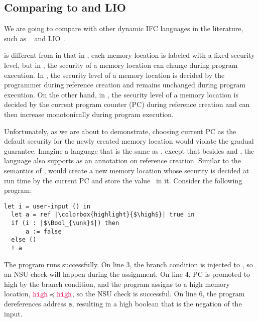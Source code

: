 \subsection{Comparing \DynIFC to \laminfo and LIO}
\label{sec:compare-dynifc}

We are going to compare \DynIFC with other dynamic IFC languages in the
literature, such as \laminfo~\parencite{austin2009efficient} and
LIO~\parencite{STEFAN:2017ta}.

\DynIFC is different from \laminfo in that in \DynIFC, each memory location is
labeled with a fixed security level, but in \laminfo, the security of a memory
location can change during program execution. In \DynIFC, the security level of
a memory location is decided by the programmer during reference creation and
remains unchanged during program execution. On the other hand, in \laminfo, the
security level of a memory location is decided by the current program counter
(PC) during reference creation and can then increase monotonically during
program execution.

Unfortunately, as we are about to demonstrate, choosing current PC as the
default security for the newly created memory location would violate the gradual
guarantee. Imagine a language that is the same as \Surface, except that besides
\low and \high, the language also supports \unk as an annotation on reference
creation. Similar to the semantics of \laminfo,
 would create a new memory location
whose security is decided at run time by the current PC and store the value
\true~in it. Consider the following program:

\noindent
{}
\begin{lstlisting}[style=tt,basicstyle=\ttfamily\footnotesize]
  let i = user-input () in
  let a = ref |\colorbox{highlight}{$\high$}| true in
  if (i : |$\Bool_{\unk}$|) then
      a := false
  else ()
  ! a
\end{lstlisting}

\noindent The  program runs successfully. On line 3, the
branch condition is injected to \unk, so an NSU check will happen during the
assignment. On line 4, PC is promoted to high by the branch condition, and the
program assigns to a high memory location, $\high \preccurlyeq \high$, so the
NSU check is successful. On line 6, the program dereferences address \texttt{a},
resulting in a high boolean that is the negation of the input.


